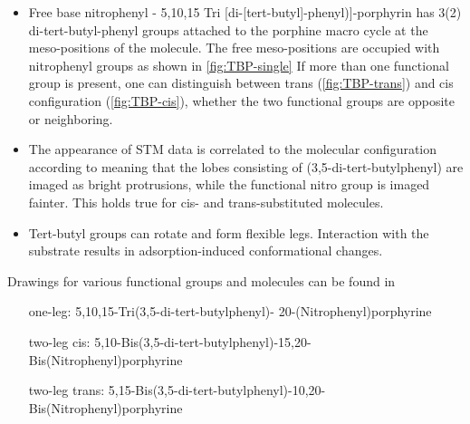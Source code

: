 \begin{itemize}
	\item Free base nitrophenyl - 5,10,15 Tri [di-[tert-butyl]-phenyl)]-porphyrin  has 3(2) di-tert-butyl-phenyl groups attached to the porphine macro cycle at the meso-positions of the molecule. The free meso-positions are occupied with nitrophenyl groups as shown in \autoref{fig:TBP-single} If more than one functional group is present, one can distinguish between trans (\autoref{fig:TBP-trans}) and cis configuration (\autoref{fig:TBP-cis}), whether the two functional groups are opposite or neighboring.
	\item The appearance of STM data is correlated to the molecular configuration according to \cite{mishra_current-driven_2015} meaning that the lobes consisting of (3,5-di-tert-butylphenyl) are imaged as bright protrusions, while the functional nitro group is imaged fainter. This holds true for cis- and trans-substituted molecules\cite{yokoyama_selective_2001}.
	\item Tert-butyl groups can rotate and form flexible legs. Interaction with the substrate results in adsorption-induced conformational changes.\cite{ecija_dynamics_2016}
\end{itemize}
Drawings for various functional groups and molecules can be found in \cite{jorgensen_salem_1973}

\begin{itemize}
	\item[one-leg:]  	 5,10,15-Tri(3,5-di-tert-butylphenyl)-   20-(Nitrophenyl)porphyrine
	\item[two-leg cis:] 	5,10-Bis(3,5-di-tert-butylphenyl)-15,20-Bis(Nitrophenyl)porphyrine
	\item[two-leg trans:] 	5,15-Bis(3,5-di-tert-butylphenyl)-10,20-Bis(Nitrophenyl)porphyrine
\end{itemize}

